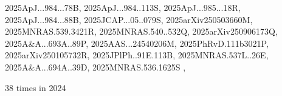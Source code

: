 \documentclass[12pt]{article}
\begin{document}
\begin{description}
{2025ApJ...984...78B,%
2025ApJ...984..113S,%
2025ApJ...985...18R,%
2025ApJ...984...88B,%
2025JCAP...05..079S,%
2025arXiv250503660M,%
2025MNRAS.539.3421R,%
2025MNRAS.540..532Q,%
2025arXiv250906173Q,%
2025A&A...693A..89P,%
2025AAS...24540206M,%
2025PhRvD.111b3021P,%
2025arXiv250105732R,%
2025JPlPh..91E.113B,%
2025MNRAS.537L..26E,%
2025A&A...694A..39D,%
2025MNRAS.536.1625S%
}, \item %
38 times in 2024 \citep{
2024GMS...283..179C,%
2024AGUFMSH13B2928M,%
2024arXiv241112953Z,%
2024PhFl...36k5152L,%
}
\end{description}
\end{document}
